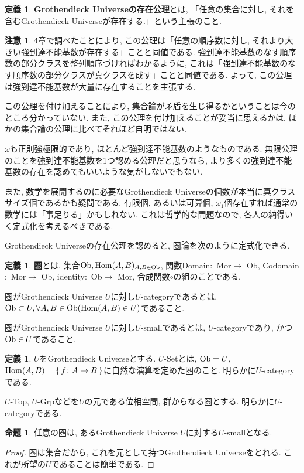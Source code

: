 \documentclass[a4paper, twoside]{bxjsarticle}
\theoremstyle{definition}
\newtheorem{prop}[thm]{命題}
\newtheorem{defn}[thm]{定義}
\newtheorem{rem}[thm]{注意}
\begin{document}
        \begin{defn}
            \textbf{Grothendieck Universeの存在公理}とは, 「任意の集合に対し, それを含むGrothendieck Universeが存在する.」という主張のこと.
        \end{defn}
        \begin{rem}
        4章で調べたことにより, この公理は「任意の順序数に対し, それより大きい強到達不能基数が存在する」ことと同値である. 強到達不能基数のなす順序数の部分クラスを整列順序づければわかるように, これは「強到達不能基数のなす順序数の部分クラスが真クラスを成す」ことと同値である. よって, この公理は強到達不能基数が大量に存在することを主張する.
        
        この公理を付け加えることにより, 集合論が矛盾を生じ得るかということは今のところ分かっていない. また, この公理を付け加えることが妥当に思えるかは, ほかの集合論の公理に比べてそれほど自明ではない. 
        
        $\omega$も正則強極限的であり, ほとんど強到達不能基数のようなものである. 無限公理のことを強到達不能基数を1つ認める公理だと思うなら, より多くの強到達不能基数の存在を認めてもいいような気がしないでもない.
        
        また, 数学を展開するのに必要なGrothendieck Universeの個数が本当に真クラスサイズ個であるかも疑問である. 有限個, あるいは可算個, $\omega_1$個存在すれば通常の数学には「事足りる」かもしれない. これは哲学的な問題なので, 各人の納得いく定式化を考えるべきである.
        \end{rem}
        
        Grothendieck Universeの存在公理を認めると, 圏論を次のように定式化できる.
        
        \begin{defn}
            \textbf{圏}とは, 集合${\rm Ob}, {\rm Hom}(A, B)_{A, B\in {\rm Ob}}$, 関数Domain$\colon$ Mor$\to$ Ob, Codomain$\colon$ Mor$\to$ Ob, identity$\colon$ Ob$\to$ Mor, 合成関数$\circ$の組のことである.
            
            圏がGrothendieck Universe $U$に対し$U$-categoryであるとは, ${\rm Ob}\subset U, \forall A, B\in {\rm Ob}({\rm Hom}(A, B)\in U)$であること. 
            
            圏がGrothendieck Universe $U$に対し$U$-smallであるとは, $U$-categoryであり, かつ${\rm Ob}\in U$であること.
        \end{defn}
        \begin{defn}
            $U$をGrothendieck Universeとする. $U$-Setとは, ${\rm Ob}=U$, ${\rm Hom}(A, B) =\set{f\colon A\to B}$に自然な演算を定めた圏のこと. 明らかに$U$-categoryである.
            
            $U$-Top, $U$-Grpなどを$U$の元である位相空間, 群からなる圏とする. 明らかに$U$-categoryである.
        \end{defn}
        \begin{prop}
            任意の圏は, あるGrothendieck Universe $U$に対する$U$-smallとなる.
        \end{prop}
        \begin{proof}
            圏は集合だから, これを元として持つGrothendieck Universeをとれる. これが所望の$U$であることは簡単である.
        \end{proof}
        
\end{document}
